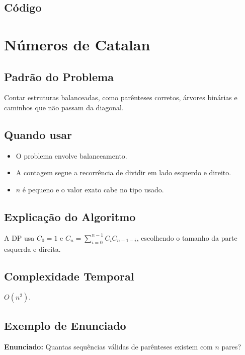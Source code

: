 \subsection{Código}

\section{Números de Catalan}

\subsection{Padrão do Problema}
Contar estruturas balanceadas, como parênteses corretos, árvores binárias e caminhos que não passam da diagonal.

\subsection{Quando usar}
\begin{itemize}[nosep]
  \item O problema envolve balanceamento.
  \item A contagem segue a recorrência de dividir em lado esquerdo e direito.
  \item $n$ é pequeno e o valor exato cabe no tipo usado.
\end{itemize}

\subsection{Explicação do Algoritmo}
A DP usa $C_0=1$ e $C_n=\sum_{i=0}^{n-1} C_iC_{n-1-i}$, escolhendo o tamanho da parte esquerda e direita.

\subsection{Complexidade Temporal}
$O(n^2)$.

\subsection{Exemplo de Enunciado}
\begin{exemplodiabox}
\textbf{Enunciado:} Quantas sequências válidas de parênteses existem com $n$ pares?
\end{exemplodiabox}

